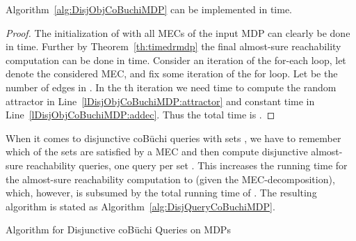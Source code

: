 \documentclass[11pt,letterpaper]{article}
\begin{document}
\begin{proposition}[Runtime] 
	Algorithm~\ref{alg:DisjObjCoBuchiMDP} can be implemented in  time.
\end{proposition}
\begin{proof}
    The initialization of  with all MECs of the input
    MDP  can clearly be done in  time. Further by 
    Theorem~\ref{th:timedrmdp} the final almost-sure reachability computation
    can be done in  time. 
    Consider an iteration of the for-each loop, 
    let  denote the considered MEC, and fix some iteration  of the for loop. 
    Let  be the number of edges in .
    In the th iteration we need  time
    to compute the random attractor in Line~\ref{lDisjObjCoBuchiMDP:attractor}
    and constant time in Line~\ref{lDisjObjCoBuchiMDP:addec}.
    Thus the total time is .
\end{proof}

When it comes to disjunctive coBüchi queries with  sets , 
we have to remember which of the sets  are satisfied by a MEC and 
then compute disjunctive almost-sure reachability queries,
one query per set .
This increases the running time for the almost-sure reachability computation
to  (given the MEC-decomposition),
which, however, is subsumed by the total running time of .
The resulting algorithm is stated as Algorithm~\ref{alg:DisjQueryCoBuchiMDP}.

\begin{algorithm}
	\caption{Algorithm for Disjunctive coBüchi Queries on MDPs}
	\label{alg:DisjQueryCoBuchiMDP}
	\BlankLine
	\Output
	{
	  
	}
	\BlankLine
	\;
	\For{}{
	  \;
	}
	
	\ForEach{}{
		\For{}{
		    \If{}{
				  \;
		    }
		}
	}
	\Return{\;}
\end{algorithm}
\end{document}
